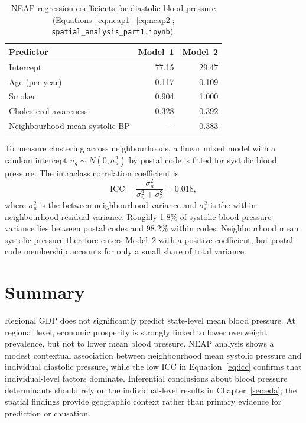 \begin{table}[h]
    \centering
    \caption{NEAP regression coefficients for diastolic blood pressure (Equations~\eqref{eq:neap1}--\eqref{eq:neap2}; \texttt{spatial\_analysis\_part1.ipynb}).}
    \label{tab:neap}
    \begin{tabular}{lrr}
        \toprule
        \textbf{Predictor} & \textbf{Model~1} & \textbf{Model~2} \\
        \midrule
        Intercept & 77.15 & 29.47 \\
        Age (per year) & 0.117 & 0.109 \\
        Smoker & 0.904 & 1.000 \\
        Cholesterol awareness & 0.328 & 0.392 \\
        Neighbourhood mean systolic BP & --- & 0.383 \\
        \bottomrule
    \end{tabular}
\end{table}

To measure clustering across neighbourhoods, a linear mixed model with a random intercept $u_g \sim N(0, \sigma_u^2)$ by postal code is fitted for systolic blood pressure. The intraclass correlation coefficient is
\begin{equation}
    \mathrm{ICC} = \frac{\sigma_u^2}{\sigma_u^2 + \sigma_\varepsilon^2} = 0.018,
    \label{eq:icc}
\end{equation}
where $\sigma_u^2$ is the between-neighbourhood variance and $\sigma_\varepsilon^2$ is the within-neighbourhood residual variance. Roughly 1.8\% of systolic blood pressure variance lies between postal codes and 98.2\% within codes. Neighbourhood mean systolic pressure therefore enters Model~2 with a positive coefficient, but postal-code membership accounts for only a small share of total variance.

\section{Summary}
\label{sec:spatial_summary}

Regional GDP does not significantly predict state-level mean blood pressure. At regional level, economic prosperity is strongly linked to lower overweight prevalence, but not to lower mean blood pressure. NEAP analysis shows a modest contextual association between neighbourhood mean systolic pressure and individual diastolic pressure, while the low ICC in Equation~\eqref{eq:icc} confirms that individual-level factors dominate. Inferential conclusions about blood pressure determinants should rely on the individual-level results in Chapter~\ref{sec:eda}; the spatial findings provide geographic context rather than primary evidence for prediction or causation.
